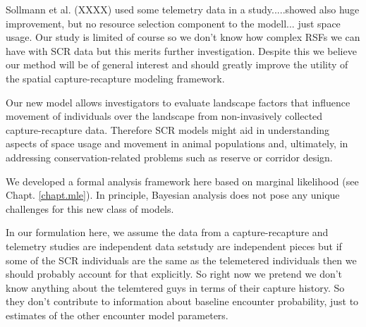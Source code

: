 Sollmann et al. (XXXX) used some telemetry data in a study.....showed
also huge improvement, but no resource selection component to the
modell... just space usage. 
Our study is limited of course so we don't know how complex RSFs we
can have with SCR data but this merits further investigation. Despite
this we believe our method will be of general interest and should
greatly improve the utility of the spatial capture-recapture modeling
framework. 


Our new model allows investigators to evaluate landscape factors that
influence movement of individuals over the landscape from
non-invasively collected capture-recapture data.  Therefore SCR models
might aid in understanding aspects of space usage and movement in
animal populations and, ultimately, in addressing conservation-related
problems such as reserve or corridor design.

We developed a formal analysis framework here based on 
marginal likelihood \citep{borchers_efford:2008}
(see Chapt. \ref{chapt.mle}).
In principle,
Bayesian analysis does not pose any unique challenges for this new
class of models.

In our formulation here, 
we assume the data from a capture-recapture and telemetry studies are
independent data setstudy 
are independent pieces but if some of the SCR
individuals are the same as the telemetered individuals then we should
probably account for that explicitly. So right now we pretend we don't
know anything about the telemtered guys in terms of their capture
history. So they don't contribute to information about baseline
encounter probability, just to estimates of the other encounter model
parameters. 

























